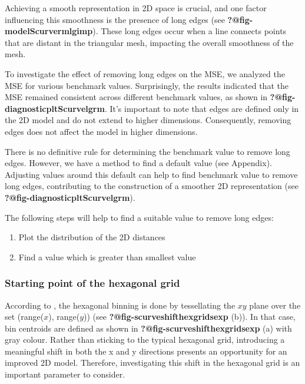 \documentclass[
  12pt]{article}
\begin{document}
Achieving a smooth representation in 2D space is crucial, and one factor
influencing this smoothness is the presence of long edges (see
\textbf{?@fig-modelScurvermlgimp}). These long edges occur when a line
connects points that are distant in the triangular mesh, impacting the
overall smoothness of the mesh.

To investigate the effect of removing long edges on the MSE, we analyzed
the MSE for various benchmark values. Surprisingly, the results
indicated that the MSE remained consistent across different benchmark
values, as shown in \textbf{?@fig-diagnosticpltScurvelgrm}. It's
important to note that edges are defined only in the 2D model and do not
extend to higher dimensions. Consequently, removing edges does not
affect the model in higher dimensions.

There is no definitive rule for determining the benchmark value to
remove long edges. However, we have a method to find a default value
(see Appendix). Adjusting values around this default can help to find
benchmark value to remove long edges, contributing to the construction
of a smoother 2D representation (see
\textbf{?@fig-diagnosticpltScurvelgrm}).

The following steps will help to find a suitable value to remove long
edges:

\begin{enumerate}
\def\labelenumi{\arabic{enumi}.}
\item
  Plot the distribution of the 2D distances
\item
  Find a value which is greater than smallest value
\end{enumerate}

\hypertarget{starting-point-of-the-hexagonal-grid}{%
\subsubsection{Starting point of the hexagonal
grid}\label{starting-point-of-the-hexagonal-grid}}

According to \citet{Dan2023}, the hexagonal binning is done by
tessellating the \(xy\) plane over the set (range(\(x\)), range(\(y\)))
(see \textbf{?@fig-scurveshifthexgridsexp} (b)). In that case, bin
centroids are defined as shown in \textbf{?@fig-scurveshifthexgridsexp}
(a) with gray colour. Rather than sticking to the typical hexagonal
grid, introducing a meaningful shift in both the x and y directions
presents an opportunity for an improved 2D model. Therefore,
investigating this shift in the hexagonal grid is an important parameter
to consider.
\end{document}
